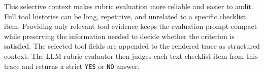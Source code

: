 \documentclass{llmxive}
\providecommand{\tcolorboxPromptEvaluationPromptTitleText}{\fontsize{10}{12}\selectfont}
\providecommand{\tcolorboxPromptEvaluationPromptCommonText}{\fontsize{7.5}{9}\selectfont}
\providecommand{\tcolorboxPromptEvaluationPromptTitleBeforeVspace}{\vspace{10 pt}}
\providecommand{\tcolorboxPromptEvaluationPromptCommonTextLineSkip}{\setlength{\baselineskip}{5 pt}}
\begin{document}
This selective context makes rubric evaluation more reliable and easier to audit. Full tool histories can be long, repetitive, and unrelated to a specific checklist item. Providing only relevant tool evidence keeps the evaluation prompt compact while preserving the information needed to decide whether the criterion is satisfied. The selected tool fields are appended to the rendered trace as structured context. The LLM rubric evaluator then judges each text checklist item from this trace and returns a strict \texttt{YES} or \texttt{NO} answer.




\renewcommand{\tcolorboxPromptEvaluationPromptTitleText}{}
\renewcommand{\tcolorboxPromptEvaluationPromptCommonText}{}
\renewcommand{\tcolorboxPromptEvaluationPromptTitleBeforeVspace}{}
\renewcommand{\tcolorboxPromptEvaluationPromptCommonTextLineSkip}{}
\end{document}
